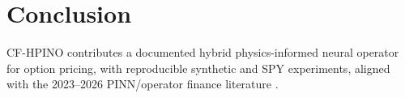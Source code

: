 \documentclass[10pt,a4paper]{article}
\begin{document}
\section{Conclusion}

CF-HPINO contributes a documented hybrid physics-informed neural operator for option pricing, with reproducible synthetic and SPY experiments, aligned with the 2023--2026 PINN/operator finance literature \cite{ref01_dhiman2023,ref04_elbayed2025,ref08_hainaut2024,ref11_pande2025}.



\end{document}
